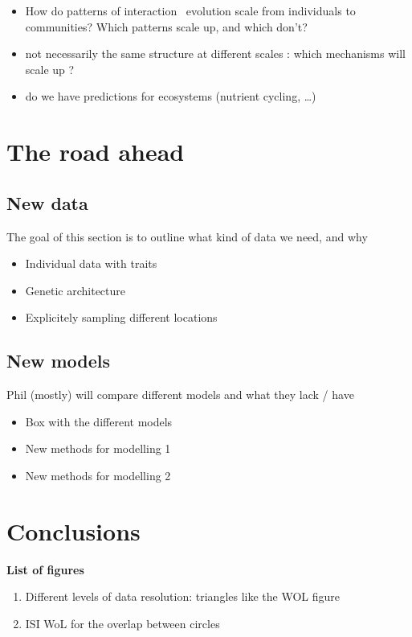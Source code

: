\documentclass[11pt,oneside]{article}
\begin{document}
\begin{itemize}
    \item How do patterns of interaction \ evolution scale from individuals to
        communities? Which patterns scale up, and which don't?
    \item not necessarily the same structure at different scales : which mechanisms will scale up ?
    \item do we have predictions for ecosystems (nutrient cycling, \ldots)
\end{itemize}


\section{The road ahead}

\subsection{New data}

The goal of this section is to outline what kind of data we need, and why

\begin{itemize}
	\item Individual data with traits
	\item Genetic architecture
	\item Explicitely sampling different locations
\end{itemize}

\subsection{New models}

Phil (mostly) will compare different models and what they lack / have 

\begin{itemize}
	\item Box with the different models
	\item New methods for modelling 1
	\item New methods for modelling 2
\end{itemize}


\section{Conclusions}

\printbibliography

\cleardoublepage

\textbf{List of figures}
\begin{enumerate}
	\item Different levels of data resolution: triangles like the WOL figure
	\item ISI WoL for the overlap between circles
\end{enumerate}
\end{document}
